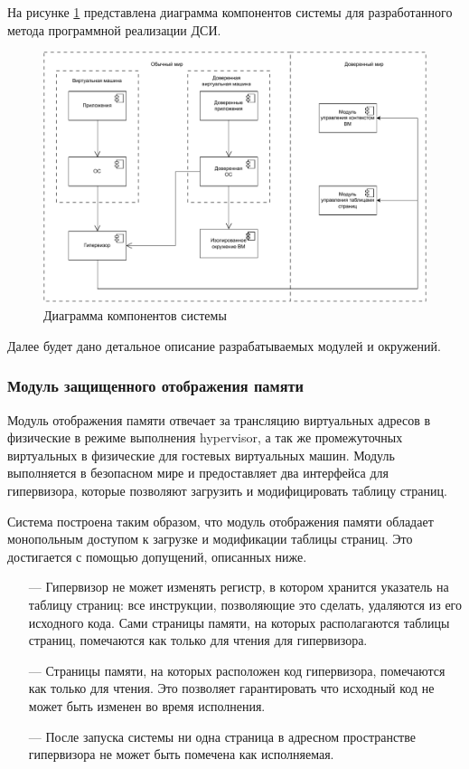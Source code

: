На рисунке \ref{fig:full-design} представлена диаграмма компонентов системы для разработанного метода программной реализации ДСИ.

\begin{figure}[h!]
	\centering
	\includegraphics[width=\textwidth]{img/design-diagram-of-components.pdf}
	\caption{Диаграмма компонентов системы}
	\label{fig:full-design}
\end{figure}

Далее будет дано детальное описание разрабатываемых модулей и окружений.

\subsubsection{Модуль защищенного отображения памяти}

Модуль отображения памяти отвечает за трансляцию виртуальных адресов в физические в режиме выполнения hypervisor, а так же промежуточных виртуальных в физические для гостевых виртуальных машин. Модуль выполняется в безопасном мире и предоставляет два интерфейса для гипервизора, которые позволяют загрузить и модифицировать таблицу страниц.

Система построена таким образом, что модуль отображения памяти обладает монопольным доступом к загрузке и модификации таблицы страниц. Это достигается с помощью допущений, описанных ниже.

\begin{itemize}
	\item [---] Гипервизор не может изменять регистр, в котором хранится указатель на таблицу страниц: все инструкции, позволяющие это сделать, удаляются из его исходного кода. Сами страницы памяти, на которых располагаются таблицы страниц, помечаются как только для чтения для гипервизора.
	\item [---] Страницы памяти, на которых расположен код гипервизора, помечаются как только для чтения. Это позволяет гарантировать что исходный код не может быть изменен во время исполнения.
	\item [---] После запуска системы ни одна страница в адресном пространстве гипервизора не может быть помечена как исполняемая.
\end{itemize}

